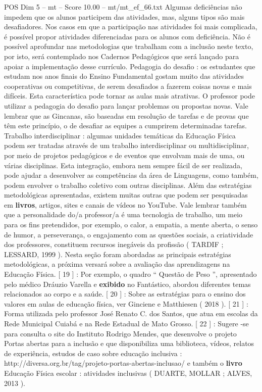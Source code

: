 \begin{textsample}{POS Dim 5 – mt – Score 10.00 – mt/mt\_ef\_66.txt}
Algumas deficiências não impedem que os alunos participem das atividades, mas, alguns tipos são mais desafiadores.
Nos casos em que a participação nas atividades foi mais complicada, é possível propor atividades diferenciadas para os alunos com deficiência.
Não é possível aprofundar nas metodologias que trabalham com a inclusão neste texto, por isto, será contemplado nos Cadernos Pedagógicos que será lançado para apoiar a implementação desse currículo.
Pedagogia do desafio : os estudantes que estudam nos anos finais do Ensino Fundamental gostam muito das atividades cooperativas ou competitivas, de serem desafiados a fazerem coisas novas e mais difíceis.
Esta característica pode tornar as aulas mais atrativas.
O professor pode utilizar a pedagogia do desafio para lançar problemas ou propostas novas.
Vale lembrar que as Gincanas, são baseadas em resolução de tarefas e de provas que têm este princípio, o de desafiar as equipes a cumprirem determinadas tarefas.
Trabalho interdisciplinar : algumas unidades temáticas da Educação Física podem ser tratadas através de um trabalho interdisciplinar ou multidisciplinar, por meio de projetos pedagógicos e de eventos que envolvam mais de uma, ou várias disciplinas.
Esta integração, embora nem sempre fácil de ser realizada, pode ajudar a desenvolver as competências da área de Linguagens, como também, podem envolver o trabalho coletivo com outras disciplinas.
Além das estratégias metodológicas apresentadas, existem muitas outras que podem ser pesquisadas em \textbf{livros}, artigos, sites e canais de vídeos no YouTube.
Vale lembrar também que a personalidade do/a professor/a é uma tecnologia de trabalho, um meio para os fins pretendidos, por exemplo, o calor, a empatia, a mente aberta, o senso de humor, a perseverança, o engajamento com as questões sociais, a criatividade dos professores, constituem recursos inegáveis da profissão ( TARDIF ; LESSARD, 1999 ).
Nesta seção foram abordadas as principais estratégias metodológicas, a próxima versará sobre a avaliação das aprendizagens na Educação Física. [ 19 ] : Por exemplo, o quadro “ Questão de Peso ”, apresentado pelo médico Dráuzio Varella e \textbf{exibido} no Fantástico, abordou diferentes temas relacionados ao corpo e a saúde. [ 20 ] : Sobre as estratégias para o ensino dos valores em aulas de educação física, ver Ginciene e Matthiesen ( 2018 ). [ 21 ] : Forma utilizada pelo professor José Renato C. dos Santos, que atua em escolas da Rede Municipal Cuiabá e na Rede Estadual de Mato Grosso. [ 22 ] : Sugere -se para consulta o site do Instituto Rodrigo Mendes, que desenvolve o projeto Portas abertas para a inclusão e que disponibiliza uma biblioteca, vídeos, relatos de experiência, estudos de caso sobre educação inclusiva : http://diversa.org.br/tag/projeto-portas-abertas-inclusao/ e também o \textbf{livro} Educação Física escolar : atividades inclusivas ( DUARTE, MOLLAR ; ALVES, 2013 ).

\end{textsample}
